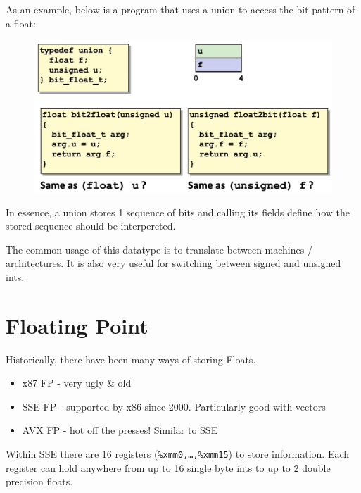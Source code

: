 \documentclass[12pt]{book}
\begin{document}
As an example, below is a program that uses a union to access the bit pattern of a float:
\begin{figure}[h]
        \centering
        \includegraphics[scale = 0.4]{./figures/unionEx}
\end{figure}

In essence, a union stores 1 sequence of bits and calling its fields define how the stored 
sequence should be interpereted. 

The common usage of this datatype is to translate between machines / architectures.
It is also very useful for switching between signed and unsigned ints.

\section*{Floating Point}
Historically, there have been many ways of storing Floats.
\begin{itemize}
        \item x87 FP - very ugly \& old
        \item SSE FP - supported by x86 since 2000. Particularly good with vectors
        \item AVX FP - hot off the presses! Similar to SSE
\end{itemize}

Within SSE there are 16 registers (\texttt{\%xmm0,\ldots,\%xmm15}) to store information. Each register can hold anywhere from 
up to 16 single byte ints to up to 2 double precision floats.
\pagebreak
\end{document}
